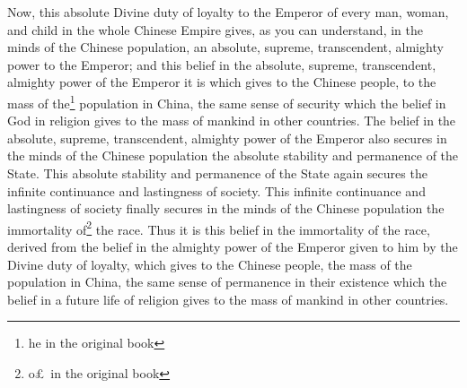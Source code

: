 Now, this absolute Divine duty of loyalty to the Emperor of every man, woman, and child in the whole Chinese Empire gives, as you can understand, in the minds of the Chinese population, an absolute, supreme, transcendent, almighty power to the Emperor; and this belief in the absolute, supreme, transcendent, almighty power of the Emperor it is which gives to the Chinese people, to the mass of the\footnote{he in the original book} population in China, the same sense of security which the belief in God in religion gives to the mass of mankind in other countries.
The belief in the absolute, supreme, transcendent, almighty power of the Emperor also secures in the minds of the Chinese population the absolute stability and permanence of the State.
This absolute stability and permanence of the State again secures the infinite continuance and lastingness of society.
This infinite continuance and lastingness of society finally secures in the minds of the Chinese population the immortality of\footnote{o\pounds\, in the original book} the race.
Thus it is this belief in the immortality of the race, derived from the belief in the almighty power of the Emperor given to him by the Divine duty of loyalty, which gives to the Chinese people, the mass of the population in China, the same sense of permanence in their existence which the belief in a future life of religion gives to the mass of mankind in other countries.

